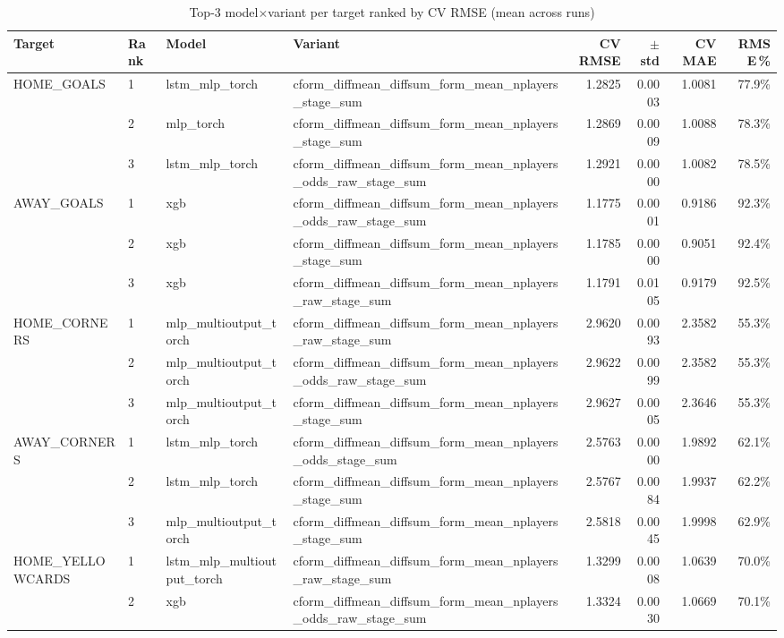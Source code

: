 \begin{table}[ht]
\centering
\caption{Top-3 model$\times$variant per target ranked by CV RMSE (mean across runs)}
\label{tab:leaderboard}
\small
\begin{tabular}{llllrrrr}
\toprule
Target & Rank & Model & Variant & CV RMSE & $\pm$std & CV MAE & RMSE\,\% \\
\midrule
HOME\_GOALS & 1 & lstm\_mlp\_torch & cform_diffmean_diffsum_form_mean_nplayers_stage_sum & 1.2825 & 0.0003 & 1.0081 & 77.9\% \\
 & 2 & mlp\_torch & cform_diffmean_diffsum_form_mean_nplayers_stage_sum & 1.2869 & 0.0009 & 1.0088 & 78.3\% \\
 & 3 & lstm\_mlp\_torch & cform_diffmean_diffsum_form_mean_nplayers_odds_raw_stage_sum & 1.2921 & 0.0000 & 1.0082 & 78.5\% \\
\midrule
AWAY\_GOALS & 1 & xgb & cform_diffmean_diffsum_form_mean_nplayers_odds_raw_stage_sum & 1.1775 & 0.0001 & 0.9186 & 92.3\% \\
 & 2 & xgb & cform_diffmean_diffsum_form_mean_nplayers_stage_sum & 1.1785 & 0.0000 & 0.9051 & 92.4\% \\
 & 3 & xgb & cform_diffmean_diffsum_form_mean_nplayers_raw_stage_sum & 1.1791 & 0.0105 & 0.9179 & 92.5\% \\
\midrule
HOME\_CORNERS & 1 & mlp\_multioutput\_torch & cform_diffmean_diffsum_form_mean_nplayers_raw_stage_sum & 2.9620 & 0.0093 & 2.3582 & 55.3\% \\
 & 2 & mlp\_multioutput\_torch & cform_diffmean_diffsum_form_mean_nplayers_odds_raw_stage_sum & 2.9622 & 0.0099 & 2.3582 & 55.3\% \\
 & 3 & mlp\_multioutput\_torch & cform_diffmean_diffsum_form_mean_nplayers_stage_sum & 2.9627 & 0.0005 & 2.3646 & 55.3\% \\
\midrule
AWAY\_CORNERS & 1 & lstm\_mlp\_torch & cform_diffmean_diffsum_form_mean_nplayers_odds_stage_sum & 2.5763 & 0.0000 & 1.9892 & 62.1\% \\
 & 2 & lstm\_mlp\_torch & cform_diffmean_diffsum_form_mean_nplayers_stage_sum & 2.5767 & 0.0084 & 1.9937 & 62.2\% \\
 & 3 & mlp\_multioutput\_torch & cform_diffmean_diffsum_form_mean_nplayers_stage_sum & 2.5818 & 0.0045 & 1.9998 & 62.9\% \\
\midrule
HOME\_YELLOWCARDS & 1 & lstm\_mlp\_multioutput\_torch & cform_diffmean_diffsum_form_mean_nplayers_raw_stage_sum & 1.3299 & 0.0008 & 1.0639 & 70.0\% \\
 & 2 & xgb & cform_diffmean_diffsum_form_mean_nplayers_odds_raw_stage_sum & 1.3324 & 0.0030 & 1.0669 & 70.1\% \\

\end{tabular}
\end{table}
